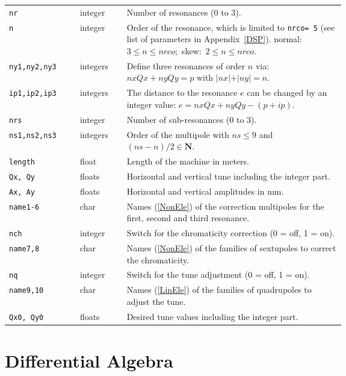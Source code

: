 \bigskip
\begin{longtabu}{@{}llp{0.65\linewidth}}
    \texttt{nr}          & integer  & Number of resonances (0 to 3). \\
    \texttt{n}           & integer  & Order of the resonance, which is limited to \texttt{nrco= 5} (see list of parameters in Appendix~\ref{DSP}). \mbox{normal: $3 \le n \le nrco$; skew: $2 \le n \le nrco$}. \\
    \texttt{ny1,ny2,ny3} & integers & Define three resonances of order $n$ via: \mbox{$nx Qx + ny Qy = p$} with \mbox{$\vert nx \vert + \vert ny \vert = n$}. \\
    \texttt{ip1,ip2,ip3} & integers & The distance to the resonance $e$ can be changed by an integer value: \mbox{$e = nx Qx + ny Qy - (p+ip)$.} \\
    \texttt{nrs}         & integer  & Number of sub-resonances (0 to 3). \\
    \texttt{ns1,ns2,ns3} & integers & Order of the multipole with \mbox{$ns \le 9$} and \mbox{$(ns-n)/2 \in {\mathbf N}$}. \\
    \texttt{length}      & float    & Length of the machine in meters. \\
    \texttt{Qx, Qy}      & floats   & Horizontal and vertical tune including the integer part. \\
    \texttt{Ax, Ay}      & floats   & Horizontal and vertical amplitudes in mm. \\
    \texttt{name1-6}     & char     & Names (\ref{NonEle}) of the correction multipoles for the first, second and third resonance. \\
    \texttt{nch}         & integer  & Switch for the chromaticity correction (0 = off, 1 = on). \\
    \texttt{name7,8}     & char     & Names (\ref{NonEle}) of the families of sextupoles to correct the chromaticity. \\
    \texttt{nq}          & integer  & Switch for the tune adjustment (0 = off, 1 = on). \\
    \texttt{name9,10}    & char     & Names (\ref{LinEle}) of the families of quadrupoles to adjust the tune. \\
    \texttt{Qx0, Qy0}    & floats   & Desired tune values including the integer part.
\end{longtabu}

\section{Differential Algebra} \label{DifAlg}

